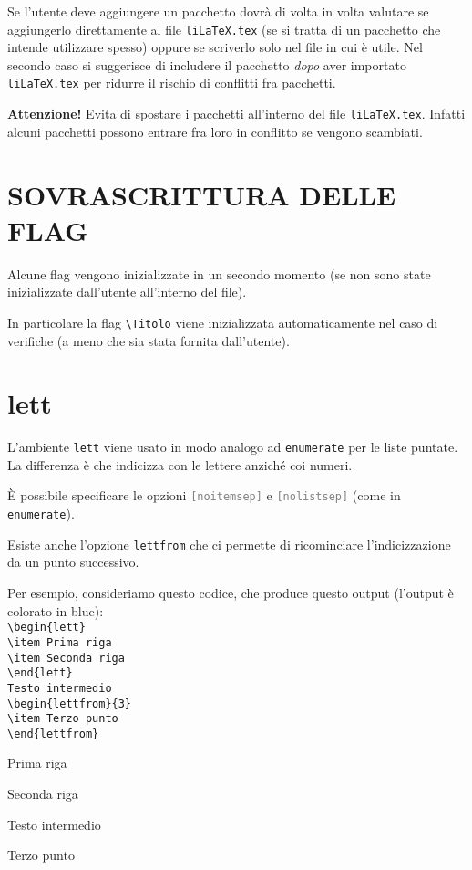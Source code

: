 \documentclass[italian, a4paper]{article}
\newcommand{\bs}{\textbackslash}
\newcommand{\ttt}[1]{\texttt{#1}}
\begin{document}
Se l'utente deve aggiungere un pacchetto dovrà di volta in volta valutare se aggiungerlo direttamente al file \ttt{liLaTeX.tex} (se si tratta di un pacchetto che intende utilizzare spesso) oppure se scriverlo solo nel file in cui è utile. Nel secondo caso si suggerisce di includere il pacchetto \textit{dopo} aver importato \ttt{liLaTeX.tex} per ridurre il rischio di conflitti fra pacchetti.

\textbf{Attenzione!} Evita di spostare i pacchetti all'interno del file \ttt{liLaTeX.tex}. Infatti alcuni pacchetti possono entrare fra loro in conflitto se vengono scambiati.

\section{SOVRASCRITTURA DELLE FLAG}
Alcune flag vengono inizializzate in un secondo momento (se non sono state inizializzate dall'utente all'interno del file).

In particolare la flag \ttt{\bs Titolo} viene inizializzata automaticamente nel caso di verifiche (a meno che sia stata fornita dall'utente).

\section{lett}
L'ambiente \ttt{lett} viene usato in modo analogo ad \ttt{enumerate} per le liste puntate. La differenza è che indicizza con le lettere anziché coi numeri.

È possibile specificare le opzioni \textcolor{gray}{\ttt{[noitemsep]}} e \textcolor{gray}{\ttt{[nolistsep]}} (come in \ttt{enumerate}).

Esiste anche l'opzione \ttt{lettfrom} che ci permette di ricominciare l'indicizzazione da un punto successivo.

Per esempio, consideriamo questo codice, che produce questo output (l'output è colorato in blue):\color{gray}\\
\ttt{\bs begin\{lett\}}\\
\ttt{\bs item Prima riga}\\
\ttt{\bs item Seconda riga}\\
\ttt{\bs end\{lett\}}\\
\ttt{Testo intermedio}\\
\ttt{\bs begin\{lettfrom\}\{3\}}\\
\ttt{\bs item Terzo punto}\\
\ttt{\bs end\{lettfrom\}}

\color{blue}
\begin{lett}
\item Prima riga
\item Seconda riga
\end{lett}
Testo intermedio
\begin{lettfrom}{3}
\item Terzo punto
\end{lettfrom}
\color{black}
\end{document}
